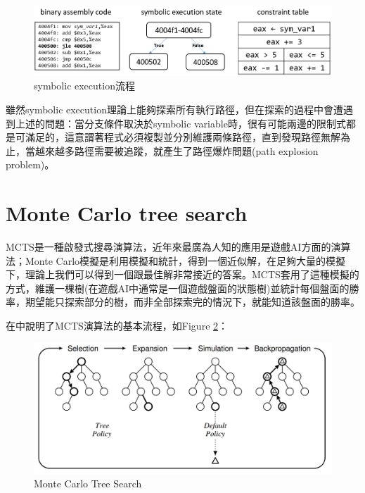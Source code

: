 \documentclass[12pt,a4paper,oneside]{book}
\begin{document}
\begin{figure}[htbp]
\center
\includegraphics[width=\textwidth]{figures/SE.PNG}
\caption{symbolic execution流程 \label{figSE}}
\end{figure}

雖然symbolic execution理論上能夠探索所有執行路徑，但在探索的過程中會遭遇到上述的問題：當分支條件取決於symbolic variable時，很有可能兩邊的限制式都是可滿足的，這意謂著程式必須複製並分別維護兩條路徑，直到發現路徑無解為止，當越來越多路徑需要被追蹤，就產生了路徑爆炸問題(path explosion problem)。

\section{Monte Carlo tree search}

MCTS是一種啟發式搜尋演算法，近年來最廣為人知的應用是遊戲AI方面的演算法；Monte Carlo模擬是利用模擬和統計，得到一個近似解，在足夠大量的模擬下，理論上我們可以得到一個跟最佳解非常接近的答案。MCTS套用了這種模擬的方式，維護一棵樹(在遊戲AI中通常是一個遊戲盤面的狀態樹)並統計每個盤面的勝率，期望能只探索部分的樹，而非全部探索完的情況下，就能知道該盤面的勝率。

在\cite{browne2012surveyMCTS}中說明了MCTS演算法的基本流程，如Figure \ref{figMCTS}：

\begin{figure}[h]
\center
\includegraphics[width=\textwidth,height=\textheight,keepaspectratio]{figures/mcts2.PNG}
\caption{Monte Carlo Tree Search \label{figMCTS}}
\end{figure}
\end{document}
